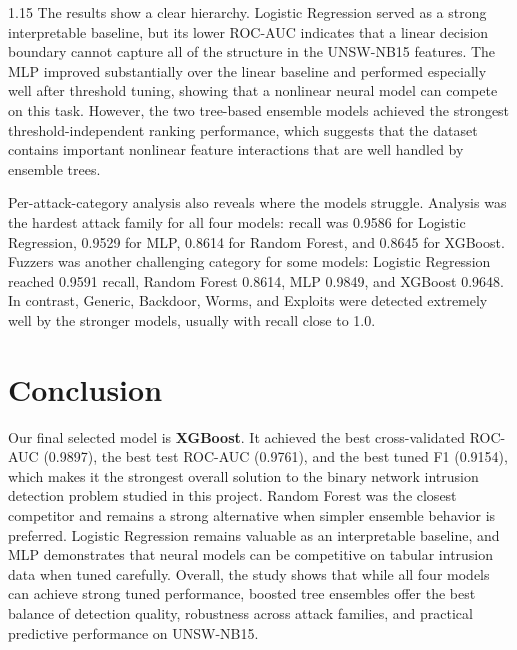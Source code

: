 \begin{spacing}{1.15}
The results show a clear hierarchy. Logistic Regression served as a strong
interpretable baseline, but its lower ROC-AUC indicates that a linear decision
boundary cannot capture all of the structure in the UNSW-NB15 features. The
MLP improved substantially over the linear baseline and performed especially
well after threshold tuning, showing that a nonlinear neural model can compete
on this task. However, the two tree-based ensemble models achieved the
strongest threshold-independent ranking performance, which suggests that the
dataset contains important nonlinear feature interactions that are well handled
by ensemble trees.

Per-attack-category analysis also reveals where the models struggle. Analysis
was the hardest attack family for all four models: recall was 0.9586 for
Logistic Regression, 0.9529 for MLP, 0.8614 for Random Forest, and 0.8645 for
XGBoost. Fuzzers was another challenging category for some models: Logistic
Regression reached 0.9591 recall, Random Forest 0.8614, MLP 0.9849, and
XGBoost 0.9648. In contrast, Generic, Backdoor, Worms, and Exploits were
detected extremely well by the stronger models, usually with recall close to
1.0.

\section{Conclusion}
Our final selected model is \textbf{XGBoost}. It achieved the best
cross-validated ROC-AUC (0.9897), the best test ROC-AUC (0.9761), and the best
tuned F1 (0.9154), which makes it the strongest overall solution to the binary
network intrusion detection problem studied in this project. Random Forest was
the closest competitor and remains a strong alternative when simpler ensemble
behavior is preferred. Logistic Regression remains valuable as an interpretable
baseline, and MLP demonstrates that neural models can be competitive on tabular
intrusion data when tuned carefully. Overall, the study shows that while all
four models can achieve strong tuned performance, boosted tree ensembles offer
the best balance of detection quality, robustness across attack families, and
practical predictive performance on UNSW-NB15.

\end{spacing}
\newpage
